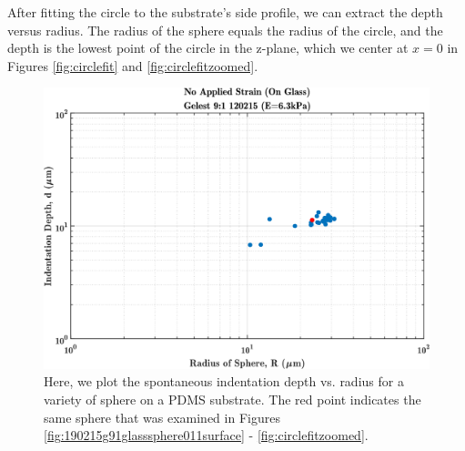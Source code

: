 After fitting the circle to the substrate's side profile, we can extract the depth versus radius. The radius of the sphere equals the radius of the circle, and the depth is the lowest point of the circle in the z-plane, which we center at $ x=0 $ in Figures \ref{fig:circlefit} and \ref{fig:circlefitzoomed}.  
\begin{figure}
	\centering
	\includegraphics[width=\linewidth]{Chapters/Figures/d_vs_R_190215_sphere11highlight}
	\caption[Depth vs. Radius Example]{Here, we plot the spontaneous indentation depth vs. radius for a variety of sphere on a PDMS substrate. The red point indicates the same sphere that was examined in Figures \ref{fig:190215g91glasssphere011surface} - \ref{fig:circlefitzoomed}.}
	\label{fig:dvsr190215sphere11highlight}
\end{figure}

